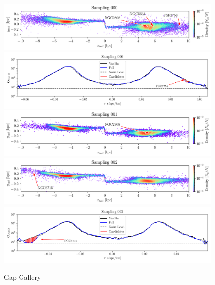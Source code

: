 \documentclass{aa}
\begin{document}
\begin{appendix}
    \begin{figure}
      \centering
      \includegraphics[width=\linewidth]{gallery_of_gaps_monte-carlo-000.png}
      \includegraphics[width=\linewidth]{tau-profile-monte-carlo-000.png}
      \includegraphics[width=\linewidth]{gallery_of_gaps_monte-carlo-001.png}
      \includegraphics[width=\linewidth]{gallery_of_gaps_monte-carlo-002.png}
      \includegraphics[width=\linewidth]{tau-profile-monte-carlo-002.png}
      \caption{Gap Gallery}
      \label{fig:gallery0}
      \end{figure}    



\end{appendix}
\end{document}
